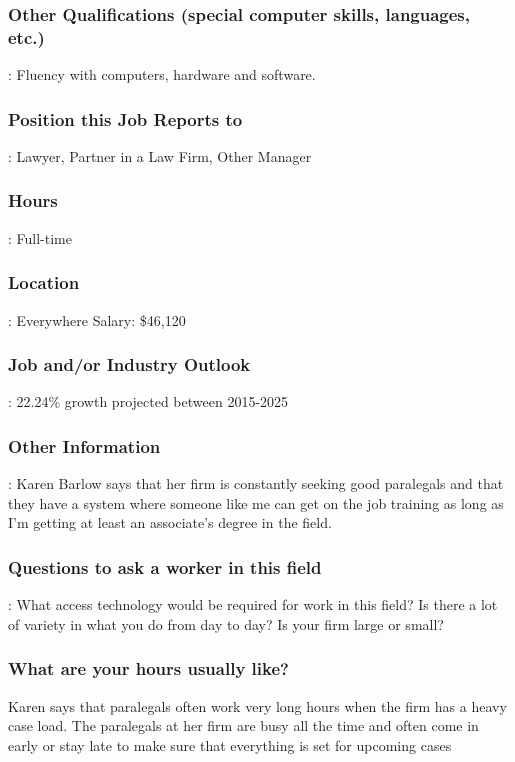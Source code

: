 \subsubsection*{Other Qualifications (special computer skills, languages, etc.)}: Fluency with computers, hardware and software.

\subsubsection*{Position this Job Reports to}: Lawyer, Partner in a Law Firm, Other Manager

\subsubsection*{Hours}: Full-time

\subsubsection*{Location}: Everywhere Salary: \$46,120

\subsubsection*{Job and/or Industry Outlook}: 22.24\% growth projected between 2015-2025

\subsubsection*{Other Information}: Karen Barlow says that her firm is constantly seeking good paralegals and that they have a system where someone like me can get on the job training as long as I'm getting at least an associate's degree in the field.

\subsubsection*{Questions to ask a worker in this field}:
\break What access technology would be required for work in this field?
\break Is there a lot of variety in what you do from day to day?
\break Is your firm large or small?

\subsubsection*{What are your hours usually like? }
\break Karen says that paralegals often work very long hours when the firm has a heavy case load. The paralegals at her firm are busy all the time and often come in early or stay late to make sure that everything is set for upcoming cases

